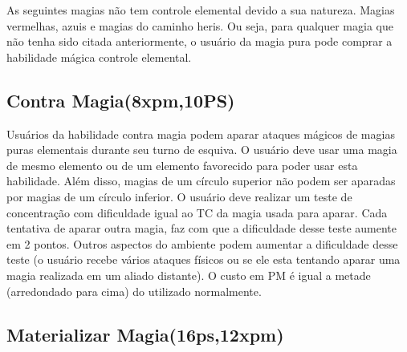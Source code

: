 As seguintes magias não tem controle elemental devido a sua natureza. Magias vermelhas, azuis e magias do caminho heris. Ou seja, para qualquer magia que não tenha sido citada anteriormente, o usuário da magia pura pode comprar a habilidade mágica controle elemental.

\subsection {Contra Magia(8xpm,10PS)}

Usuários da habilidade contra magia podem aparar ataques mágicos de magias puras elementais durante seu turno de esquiva. O usuário deve usar uma magia de mesmo elemento ou de um elemento favorecido para poder usar esta habilidade. Além disso, magias de um círculo superior não podem ser aparadas por magias de um círculo inferior. O usuário deve realizar um teste de concentração com dificuldade igual ao TC da magia usada para aparar. Cada tentativa de aparar outra magia, faz com que a dificuldade desse teste aumente em 2 pontos. Outros aspectos do ambiente podem aumentar a dificuldade desse teste (o usuário recebe vários ataques físicos ou se ele esta tentando aparar uma magia realizada em um aliado distante). O custo em PM é igual a metade (arredondado para cima) do utilizado normalmente.



\subsection{Materializar Magia(16ps,12xpm)}
 
